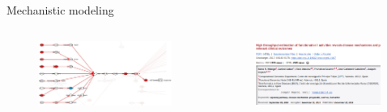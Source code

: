 \documentclass[compress,ignorenonframetext,aspectratio=1610]{beamer}
\begin{document}
\begin{frame}{Mechanistic modeling}

	\begin{columns}
		\begin{column}{0.6\textwidth}
			\begin{figure}
				\centering
				\includegraphics[width=0.99\textwidth]{figs/methods/circuit.png}
			\end{figure}
		\end{column}
		\begin{column}{0.4\textwidth}
			\begin{figure}
				\centering
				\includegraphics[width=0.99\textwidth]{figs/methods/hipathia_paper.png}
			\end{figure}
		\end{column}
	\end{columns}
	\vspace*{2em}

	\pause
	\begin{columns}
		\begin{column}{0.8\textwidth}


\end{column}
\end{columns}
\end{frame}
\end{document}
